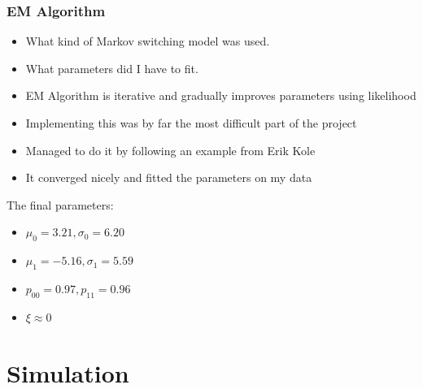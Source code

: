 \documentclass{beamer}
\begin{document}
\begin{frame}
\frametitle{EM Algorithm}
\begin{itemize}
\item What kind of Markov switching model was used.
\item What parameters did I have to fit.
\item EM Algorithm is iterative and gradually improves parameters using likelihood
\item Implementing this was by far the most difficult part of the project
\item Managed to do it by following an example from Erik Kole
\item It converged nicely and fitted the parameters on my data
\end{itemize}
The final parameters:

\begin{itemize}
\item $\mu_{0} = 3.21, \sigma_{0} = 6.20$
\item $\mu_{1} = -5.16, \sigma_{1} = 5.59$
\item $p_{00} = 0.97, p_{11} = 0.96$
\item $\xi \approx 0$
\end{itemize}


\end{frame}


\section{Simulation}
\end{document}
